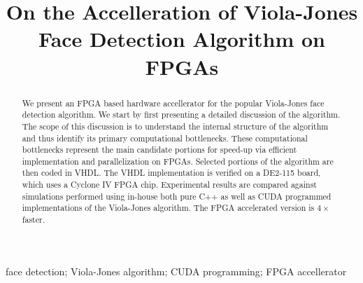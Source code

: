 \documentclass[conference]{IEEEtran}
\begin{document}
\title {On the Accelleration of Viola-Jones Face Detection Algorithm on FPGAs}

\author
{
}

	      
\maketitle


\begin {abstract}


We present an FPGA based hardware accellerator for the popular Viola-Jones face detection algorithm.
We start by first presenting a detailed discussion of the algorithm. The scope of this discussion is to understand the internal structure of the algorithm and thus identify its primary computational bottlenecks. These computational bottlenecks represent the main candidate portions for speed-up via efficient implementation and parallelization on FPGAs. 
Selected portions of the algorithm are then coded in VHDL. The VHDL implementation is verified on a DE2-115 board, which uses a Cyclone IV FPGA chip.
Experimental results are compared against simulations performed using in-house both pure C++ as well as CUDA programmed implementations of the Viola-Jones algorithm.
The FPGA accelerated version is $4\times$ faster.


\end {abstract}

\begin{IEEEkeywords}
face detection; Viola-Jones algorithm; CUDA programming; FPGA accellerator

\end{IEEEkeywords}
\end{document}
